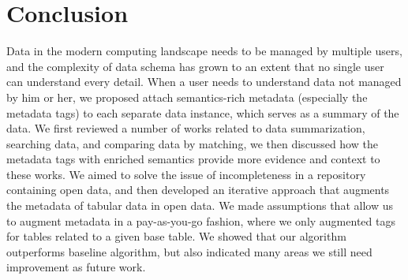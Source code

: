 
\chapter{Conclusion}
\label{ch:Conclusion}

Data in the modern computing landscape needs to be managed by multiple users, and the complexity of data schema has grown to an extent that no single user can understand every detail. When a user needs to understand data not managed by him or her, we proposed attach semantics-rich metadata (especially the metadata tags) to each separate data instance, which serves as a summary of the data. We first reviewed a number of works related to data summarization, searching data, and comparing data by matching, we then discussed how the metadata tags with enriched semantics provide more evidence and context to these works. We aimed to solve the issue of incompleteness in a repository containing open data, and then developed an iterative approach that augments the metadata of tabular data in open data. We made assumptions that allow us to augment metadata in a pay-as-you-go fashion, where we only augmented tags for tables related to a given base table. We showed that our algorithm outperforms baseline algorithm, but also indicated many areas we still need improvement as future work.


